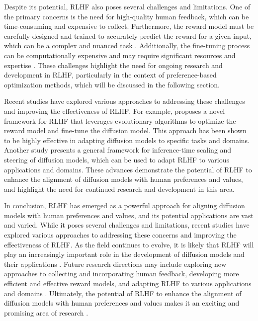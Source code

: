 \documentclass[11pt,a4paper]{article}
\begin{document}
Despite its potential, RLHF also poses several challenges and limitations. One of the primary concerns is the need for high-quality human feedback, which can be time-consuming and expensive to collect. Furthermore, the reward model must be carefully designed and trained to accurately predict the reward for a given input, which can be a complex and nuanced task \cite{arxiv:2402.01965}. Additionally, the fine-tuning process can be computationally expensive and may require significant resources and expertise \cite{arxiv:2502.06805}. These challenges highlight the need for ongoing research and development in RLHF, particularly in the context of preference-based optimization methods, which will be discussed in the following section.

Recent studies have explored various approaches to addressing these challenges and improving the effectiveness of RLHF. For example, \cite{arxiv:2410.02543} proposes a novel framework for RLHF that leverages evolutionary algorithms to optimize the reward model and fine-tune the diffusion model. This approach has been shown to be highly effective in adapting diffusion models to specific tasks and domains. Another study \cite{arxiv:2501.06848} presents a general framework for inference-time scaling and steering of diffusion models, which can be used to adapt RLHF to various applications and domains. These advances demonstrate the potential of RLHF to enhance the alignment of diffusion models with human preferences and values, and highlight the need for continued research and development in this area.

In conclusion, RLHF has emerged as a powerful approach for aligning diffusion models with human preferences and values, and its potential applications are vast and varied. While it poses several challenges and limitations, recent studies have explored various approaches to addressing these concerns and improving the effectiveness of RLHF. As the field continues to evolve, it is likely that RLHF will play an increasingly important role in the development of diffusion models and their applications \cite{doi:10.1016/j.media.2023.102846}. Future research directions may include exploring new approaches to collecting and incorporating human feedback, developing more efficient and effective reward models, and adapting RLHF to various applications and domains \cite{doi:10.1111/cgf.15063}. Ultimately, the potential of RLHF to enhance the alignment of diffusion models with human preferences and values makes it an exciting and promising area of research \cite{doi:10.1093/nsr/nwae348}.
\end{document}
